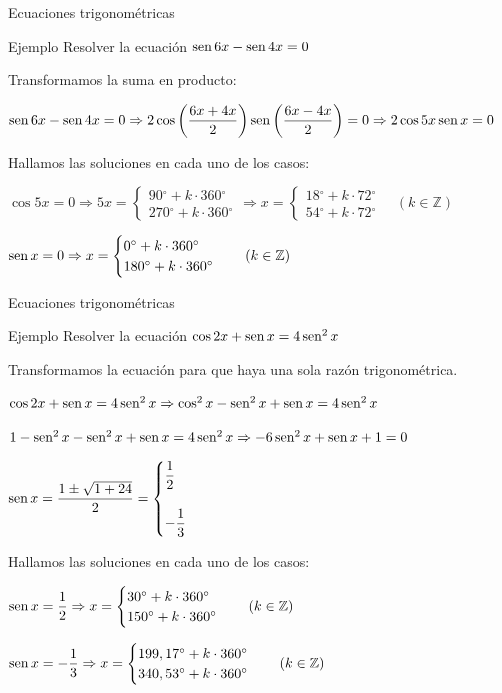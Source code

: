 \documentclass[8pt]{beamer}
\newcommand{\sen}{\mathop{\rm sen}\nolimits}
\newcommand{\Z}{\mathbb{Z}}
\newcommand{\g}{{}^\circ}
\begin{document}
\begin{frame}{Ecuaciones trigonométricas}
\begin{alertblock}{Ejemplo}
Resolver la ecuación $\sen 6x - \sen 4x= 0$
\end{alertblock}
Transformamos la suma en producto:

$\sen 6x - \sen 4x= 0 \Rightarrow 2\cos \left( \dfrac{6x+4x}{2}\right)  \sen \left( \dfrac{6x-4x}{2}\right)=0 \Rightarrow 2\cos 5x \sen x =0 $

Hallamos las soluciones en cada uno de los casos:

$\cos 5x = 0 \Rightarrow 5x= \begin{cases} 90\g+k\cdot 360\g \\ 270\g+k\cdot 360\g \end{cases} \Rightarrow x= \begin{cases} 18\g+k\cdot 72\g \\ 54\g+k\cdot 72\g \end{cases} \quad (k \in \Z)$
 
$\sen x = 0 \Rightarrow x= \begin{cases} 0\g+k\cdot 360\g \\ 180\g+k\cdot 360\g \end{cases} \quad (k \in \Z)$

\end{frame}

\begin{frame}{Ecuaciones trigonométricas}
\begin{alertblock}{Ejemplo}
Resolver la ecuación $\cos 2x+\sen x =4\sen^2 x$
\end{alertblock}
Transformamos la ecuación para que haya una sola razón trigonométrica.

$\cos 2x+\sen x =4\sen^2 x \Rightarrow \cos^2x - \sen^2 x +\sen x = 4 \sen^2 x $

$ 1-\sen^2x - \sen^2 x +\sen x = 4 \sen^2 x \Rightarrow - 6\sen^2 x +\sen x +1= 0$

$\sen x = \dfrac{1\pm \sqrt{1+24}}{2} = \begin{cases} \dfrac{1}{2} \\ \\ -\dfrac{1}{3} \end{cases}$

Hallamos las soluciones en cada uno de los casos:

$\sen x = \dfrac{1}{2} \Rightarrow x= \begin{cases} 30\g+k\cdot 360\g \\ 150\g+k\cdot 360\g \end{cases} \quad (k \in \Z)$
 
$\sen x = -\dfrac{1}{3} \Rightarrow x= \begin{cases} 199,17\g+k\cdot 360\g \\ 340,53\g+k\cdot 360\g \end{cases} \quad (k \in \Z)$

\end{frame}
\end{document}
